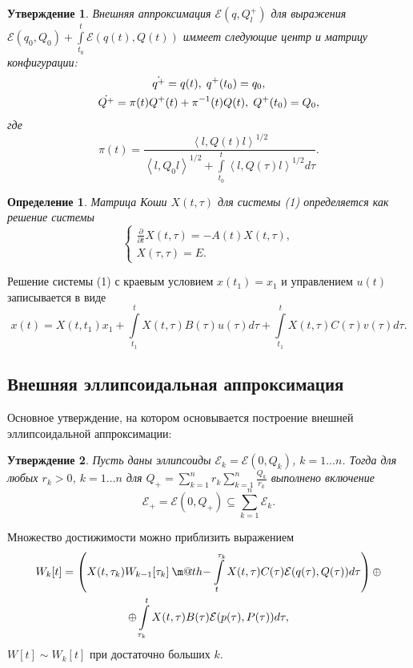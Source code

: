 \documentclass[12pt]{article}
\makeatletter
\theoremstyle{rusdef}
\newtheorem{definition}{Определение}
\newtheorem{proposition}{Утверждение}
\newcommand{\scalar}[2]{\left<#1,#2\right>}
\newcommand{\E}{\ensuremath{\mathcal{E}}} %
\newcommand{\dotminus}{\mathbin{\text{\@dotminus}}}
\newcommand{\@dotminus}{%
	\ooalign{\hidewidth\raise1ex\hbox{.}\hidewidth\cr$\m@th-$\cr}%
}
\makeatother
\begin{document}
\begin{proposition}
Внешняя аппроксимация $\E(q, Q_l^+)$ для выражения $\E(q_0, Q_0) + \int\limits_{t_0}^t \E(q(t), Q(t))$ иммеет следующие центр и матрицу конфигурации:
\begin{gather}
\dot{q^+} = q(t), \; q^+(t_0) = q_0, \notag \\
\dot{Q^+} = \pi(t) Q^+(t) + \pi^{-1}(t) Q(t), \; Q^+(t_0) = Q_0, \notag
\end{gather}
где
$$
\pi(t) = \frac{\scalar{l}{Q(t)l}^{1/2}}{\scalar{l}{Q_0 l}^{1/2} + \int\limits_{t_0}^t \scalar{l}{Q(\tau)l}^{1/2} d\tau}.
$$
\end{proposition}

\begin{definition}
Матрица Коши $X(t, \tau)$ для системы (1) определяется как решение системы
$$
\left\{
\begin{aligned}
\frac{\partial}{\partial t} X(t, \tau) = -A(t)X(t, \tau), \\
X(\tau, \tau) = E.
\end{aligned}
\right.
$$
\end{definition}

Решение системы (1) с краевым условием $x(t_1) = x_1$ и управлением $u(t)$ записывается в виде
$$
x(t) = X(t, t_1)x_1 + \int\limits_{t_1}^{t} X(t, \tau)B(\tau)u(\tau)d\tau + \int\limits_{t_1}^{t} X(t, \tau)C(\tau)v(\tau)d\tau.
$$

\subsection{Внешняя эллипсоидальная аппроксимация}
Основное утверждение, на котором основывается построение внешней эллипсоидальной аппроксимации:
\begin{proposition}
Пусть даны эллипсоиды $\E_k = \E(0, Q_k )$, $k = 1 \ldots n$. Тогда для любых $r_k > 0$, $k = 1\ldots n$ для $Q_+ = \sum\limits_{k=1}^n r_k \sum\limits_{k=1}^n \frac{Q_k}{r_k}$ выполнено включение
$$
\E_+ = \E(0, Q_+) \subseteq \sum\limits_{k=1}^n \E_k.
$$
\end{proposition}

Множество достижимости можно приблизить выражением
\begin{gather}
W_k[t] = \left( X(t, \tau_k) W_{k-1}[\tau_k] \dotminus \int\limits_{t}^{\tau_k} X(t, \tau) C(\tau) \E(q(\tau), Q(\tau)) d\tau \right) \oplus \notag \\
\oplus \int\limits_{\tau_k}^{t} X(t, \tau) B(\tau) \E(p(\tau), P(\tau)) d\tau, \notag
\end{gather}
$W[t] \sim W_k[t]$ при достаточно больших $k$.
\end{document}
